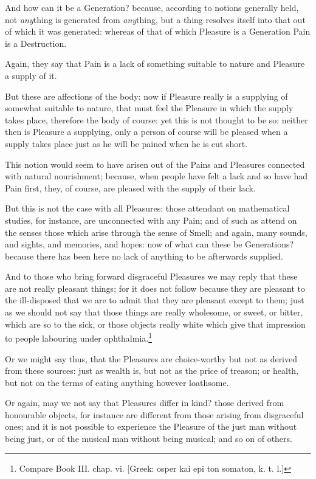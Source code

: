 And how can it be a Generation? because, according to notions generally held,
not \emph{any}thing is generated from \emph{any}thing, but a thing resolves
itself into that out of which it was generated: whereas of that of which
Pleasure is a Generation Pain is a Destruction.

Again, they say that Pain is a lack of something suitable to nature and
Pleasure a supply of it.

But these are affections of the body: now if Pleasure really is a supplying of
somewhat suitable to nature, that must feel the Pleasure in which the supply
takes place, therefore the body of course: yet this is not thought to be so:
neither then is Pleasure a supplying, only a person of course will be pleased
when a supply takes place just as he will be pained when he is cut short.

This notion would seem to have arisen out of the Pains and Pleasures connected
with natural nourishment; because, when people have felt a lack and so have had
Pain first, they, of course, are pleased with the supply of their lack.

But this is not the case with all Pleasures: those attendant on mathematical
studies, for instance, are unconnected with any Pain; and of such as attend on
the senses those which arise through the sense of Smell; and again, many
sounds, and sights, and memories, and hopes: now of what can these be
Generations? because there has been here no lack of anything to be afterwards
supplied.

And to those who bring forward disgraceful Pleasures we may reply that these
are not really pleasant things; for it does not follow because they are
pleasant to the ill-disposed that we are to admit that they are pleasant except
to them; just as we should not say that those things are really wholesome, or
sweet, or bitter, which are so to the sick, or those objects really white which
give that impression to people labouring under
ophthalmia.\footnote{Compare Book III. chap. vi. [Greek: osper kai epi ton somaton, k. t. l.]}

Or we might say thus, that the Pleasures are choice-worthy but not as derived
from these sources: just as wealth is, but not as the price of treason; or
health, but not on the terms of eating anything however loathsome.

Or again, may we not say that Pleasures differ in kind? those derived from
honourable objects, for instance are different from those arising from
disgraceful ones; and it is not possible to experience the Pleasure of the just
man without being just, or of the musical man without being musical; and so on
of others.

